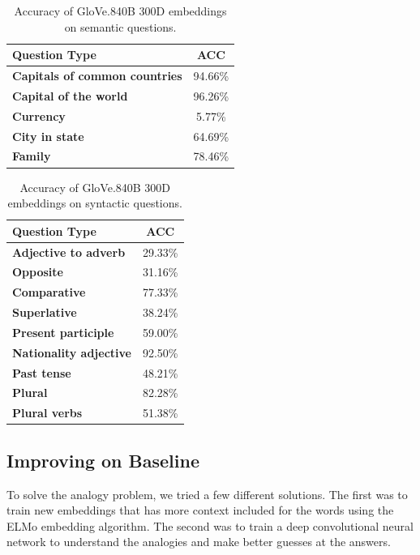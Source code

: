 \documentclass[11pt]{article}
\begin{document}
\begin{table}[h]
\begin{center}
\begin{tabular}{|l|c|}
\hline\bf Question Type & \bf ACC \\\hline
\bf Capitals of common countries & 94.66\% \\
\bf Capital of the world & 96.26\% \\
\bf Currency & 5.77\% \\
\bf City in state & 64.69\% \\
\bf Family & 78.46\% \\ \hline
\end{tabular}
\end{center}
\caption{\label{font-table} Accuracy of GloVe.840B 300D embeddings on semantic questions.}
\end{table}


\begin{table}[h]
\begin{center}
\begin{tabular}{|l|c|}
\hline\bf Question Type & ACC \\\hline
\bf Adjective to adverb & 29.33\% \\
\bf Opposite & 31.16\% \\
\bf Comparative & 77.33\% \\
\bf Superlative & 38.24\% \\
\bf Present participle & 59.00\% \\
\bf Nationality adjective & 92.50\% \\
\bf Past tense & 48.21\% \\
\bf Plural & 82.28\% \\
\bf Plural verbs & 51.38\% \\\hline
\end{tabular}
\end{center}
\caption{\label{font-table} Accuracy of GloVe.840B 300D embeddings on syntactic questions.}
\end{table}

\subsection{Improving on Baseline}

To solve the analogy problem, we tried a few different solutions. The first was
to train new embeddings that has more context included for the words using the
ELMo embedding algorithm. The second was to train a deep convolutional neural
network to understand the analogies and make better guesses at the answers.
\end{document}
